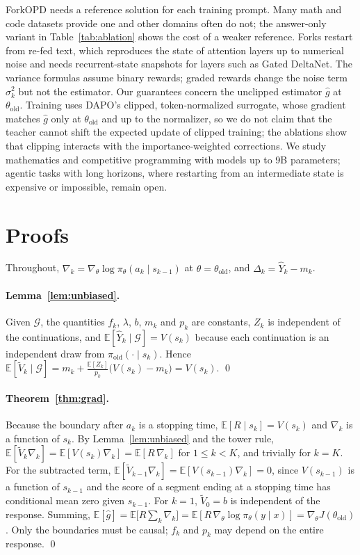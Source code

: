 \documentclass[11pt]{article}
\newcommand{\method}{ForkOPD}
\newcommand{\Vt}{\tilde V}
\newcommand{\Yh}{\hat Y}
\newcommand{\piold}{\pi_{\mathrm{old}}}
\newcommand{\E}{\mathbb{E}}
\newcommand{\G}{\mathcal{G}}
\theoremstyle{remark}
\begin{document}
\method{} needs a reference solution for each training prompt. Many math and code datasets provide one and other domains often do not; the answer-only variant in Table~\ref{tab:ablation} shows the cost of a weaker reference. Forks restart from re-fed text, which reproduces the state of attention layers up to numerical noise and needs recurrent-state snapshots for layers such as Gated DeltaNet. The variance formulas assume binary rewards; graded rewards change the noise term $\sigma_k^2$ but not the estimator. Our guarantees concern the unclipped estimator $\hat g$ at $\theta_{\mathrm{old}}$. Training uses DAPO's clipped, token-normalized surrogate, whose gradient matches $\hat g$ only at $\theta_{\mathrm{old}}$ and up to the normalizer, so we do not claim that the teacher cannot shift the expected update of clipped training; the ablations show that clipping interacts with the importance-weighted corrections. We study mathematics and competitive programming with models up to 9B parameters; agentic tasks with long horizons, where restarting from an intermediate state is expensive or impossible, remain open.



\appendix

\section{Proofs}
\label{app:proofs}

Throughout, $\nabla_k=\nabla_\theta\log\pi_\theta(a_k\mid s_{k-1})$ at $\theta=\theta_{\mathrm{old}}$, and $\Delta_k=\Yh_k-m_k$.

\paragraph{Lemma~\ref{lem:unbiased}.}
Given $\G$, the quantities $f_k$, $\lambda$, $b$, $m_k$ and $p_k$ are constants, $Z_k$ is independent of the continuations, and $\E[\Yh_k\mid\G]=V(s_k)$ because each continuation is an independent draw from $\piold(\cdot\mid s_k)$. Hence $\E[\Vt_k\mid\G]=m_k+\tfrac{\E[Z_k]}{p_k}\bigl(V(s_k)-m_k\bigr)=V(s_k)$. \qed

\paragraph{Theorem~\ref{thm:grad}.}
Because the boundary after $a_k$ is a stopping time, $\E[R\mid s_k]=V(s_k)$ and $\nabla_k$ is a function of $s_k$. By Lemma~\ref{lem:unbiased} and the tower rule, $\E[\Vt_k\nabla_k]=\E[V(s_k)\nabla_k]=\E[R\,\nabla_k]$ for $1\le k<K$, and trivially for $k=K$. For the subtracted term, $\E[\Vt_{k-1}\nabla_k]=\E[V(s_{k-1})\nabla_k]=0$, since $V(s_{k-1})$ is a function of $s_{k-1}$ and the score of a segment ending at a stopping time has conditional mean zero given $s_{k-1}$. For $k=1$, $\Vt_0=b$ is independent of the response. Summing, $\E[\hat g]=\E\bigl[R\sum_k\nabla_k\bigr]=\E[R\,\nabla_\theta\log\pi_\theta(y\mid x)]=\nabla_\theta J(\theta_{\mathrm{old}})$. Only the boundaries must be causal; $f_k$ and $p_k$ may depend on the entire response. \qed
\end{document}
